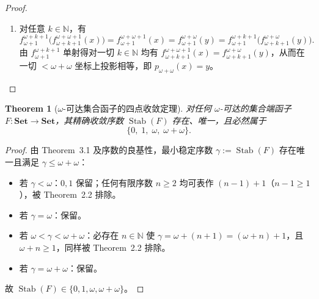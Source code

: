 \documentclass[11pt,a4paper]{ctexart}
\theoremstyle{plain}
\newtheorem{theorem}[lemma]{Theorem}
\newcommand{\Stab}{\operatorname{Stab}}
\newcommand{\Set}{\mathbf{Set}}
\begin{document}
\begin{proof}
\begin{enumerate}[label=(\arabic*)]
  \item 对任意 $k \in \mathbb{N}$，有
    \[
      f_{\omega+1}^{\omega+k+1}\bigl(f_{\omega+k+1}^{\omega+\omega+1}(x)\bigr) = f_{\omega+1}^{\omega+\omega+1}(x) = f_{\omega+1}^{\omega+\omega}(y) = f_{\omega+1}^{\omega+k+1}\bigl(f_{\omega+k+1}^{\omega+\omega}(y)\bigr).
    \]
    由 $f_{\omega+1}^{\omega+k+1}$ 单射得对一切 $k \in \mathbb{N}$ 均有 $f_{\omega+k+1}^{\omega+\omega+1}(x) = f_{\omega+k+1}^{\omega+\omega}(y)$，从而在一切 $< \omega + \omega$ 坐标上投影相等，即 $p_{\omega+\omega}(x) = y$。 \qedhere
\end{enumerate}
\end{proof}

\begin{theorem}[$\omega$-可达集合函子的四点收敛定理]
对任何 $\omega$-可达的集合端函子 $F : \Set \to \Set$，其精确收敛序数 $\Stab(F)$ 存在、唯一，且必然属于
\[
  \{0,\; 1,\; \omega,\; \omega + \omega\}.
\]
\end{theorem}

\begin{proof}
由 Theorem~3.1 及序数的良基性，最小稳定序数 $\gamma := \Stab(F)$ 存在唯一且满足 $\gamma \le \omega + \omega$：
\begin{itemize}[leftmargin=2em]
  \item 若 $\gamma < \omega$：$0, 1$ 保留；任何有限序数 $n \ge 2$ 均可表作 $(n - 1) + 1$（$n - 1 \ge 1$），被 Theorem~2.2 排除。
  \item 若 $\gamma = \omega$：保留。
  \item 若 $\omega < \gamma < \omega + \omega$：必存在 $n \in \mathbb{N}$ 使 $\gamma = \omega + (n + 1) = (\omega + n) + 1$，且 $\omega + n \ge 1$，同样被 Theorem~2.2 排除。
  \item 若 $\gamma = \omega + \omega$：保留。
\end{itemize}
故 $\Stab(F) \in \{0, 1, \omega, \omega + \omega\}$。
\end{proof}
\end{document}
